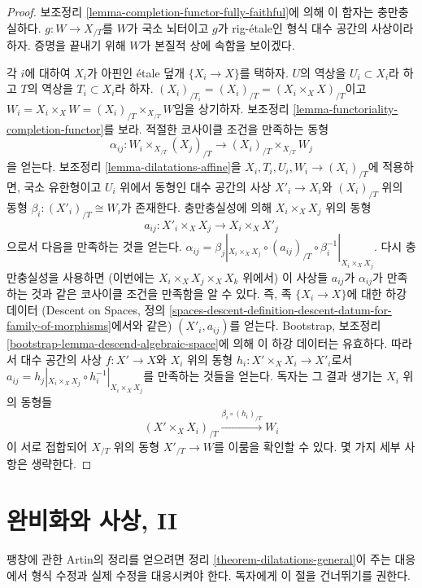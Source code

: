 \begin{proof}
보조정리 \ref{lemma-completion-functor-fully-faithful}에 의해
이 함자는 충만충실하다.
$g : W \to X_{/T}$를 $W$가 국소 뇌터이고
$g$가 rig-\'etale인 형식 대수 공간의 사상이라 하자.
증명을 끝내기 위해 $W$가 본질적 상에 속함을 보이겠다.

\medskip\noindent
각 $i$에 대하여 $X_i$가 아핀인 \'etale 덮개
$\{X_i \to X\}$를 택하자. $U$의 역상을
$U_i \subset X_i$라 하고 $T$의 역상을
$T_i \subset X_i$라 하자.
$(X_i)_{/T_i} = (X_i)_{/T} = (X_i \times_X X)_{/T}$이고
$W_i = X_i \times_X W = (X_i)_{/T} \times_{X_{/T}} W$임을
상기하자. 보조정리 \ref{lemma-functoriality-completion-functor}를 보라.
적절한 코사이클 조건을 만족하는 동형
$$
\alpha_{ij} :
W_i \times_{X_{/T}} (X_j)_{/T}
\longrightarrow 
(X_i)_{/T} \times_{X_{/T}} W_j
$$
을 얻는다. 보조정리 \ref{lemma-dilatations-affine}을
$X_i, T_i, U_i, W_i \to (X_i)_{/T}$에 적용하면,
국소 유한형이고 $U_i$ 위에서 동형인 대수 공간의 사상
$X'_i \to X_i$와 $(X_i)_{/T}$ 위의 동형
$\beta_i : (X'_i)_{/T} \cong W_i$가 존재한다.
충만충실성에 의해 $X_i \times_X X_j$ 위의 동형
$$
a_{ij} : X'_i \times_X X_j \longrightarrow X_i \times_X X'_j
$$
으로서 다음을 만족하는 것을 얻는다.
$\alpha_{ij} = \beta_j|_{X_i \times_X X_j}
\circ (a_{ij})_{/T} \circ \beta_i^{-1}|_{X_i \times_X X_j}$.
다시 충만충실성을 사용하면
(이번에는 $X_i \times_X X_j \times_X X_k$ 위에서)
이 사상들 $a_{ij}$가 $\alpha_{ij}$가 만족하는 것과 같은
코사이클 조건을 만족함을 알 수 있다.
즉, 족 $\{X_i \to X\}$에 대한 하강 데이터
(Descent on Spaces, 정의
\ref{spaces-descent-definition-descent-datum-for-family-of-morphisms}에서와 같은)
$(X'_i, a_{ij})$를 얻는다.
Bootstrap, 보조정리
\ref{bootstrap-lemma-descend-algebraic-space}에 의해
이 하강 데이터는 유효하다.
따라서 대수 공간의 사상 $f : X' \to X$와
$X_i$ 위의 동형 $h_i : X' \times_X X_i \to X'_i$로서
$a_{ij} = h_j|_{X_i \times_X X_j}
\circ h_i^{-1}|_{X_i \times_X X_j}$를 만족하는 것들을 얻는다.
독자는 그 결과 생기는 $X_i$ 위의 동형들
$$
(X' \times_X X_i)_{/T}
\xrightarrow{\beta_i \circ (h_i)_{/T}}
W_i
$$
이 서로 접합되어 $X_{/T}$ 위의 동형
$X'_{/T} \to W$를 이룸을 확인할 수 있다.
몇 가지 세부 사항은 생략한다.
\end{proof}


\section{완비화와 사상, II}
\label{section-completion-and-morphisms-bis}

\noindent
팽창에 관한 Artin의 정리를 얻으려면 정리
\ref{theorem-dilatations-general}이 주는 대응에서
형식 수정과 실제 수정을 대응시켜야 한다.
독자에게 이 절을 건너뛰기를 권한다.

